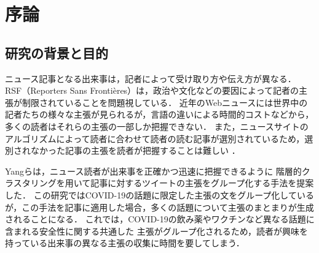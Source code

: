 \documentclass[12pt,a4j,dvipdfmx]{jreport}
\begin{document}



\chapter{序論}


\section{研究の背景と目的}

ニュース記事となる出来事は，記者によって受け取り方や伝え方が異なる．
RSF（Reporters Sans Frontières）は，政治や文化などの要因によって記者の主張が制限されていることを問題視している\cite{2021_world_press_freedom_index}．
近年のWebニュースには世界中の記者たちの様々な主張が見られるが，言語の違いによる時間的コストなどから，多くの読者はそれらの主張の一部しか把握できない．
また，ニュースサイトのアルゴリズムによって読者に合わせて読者の読む記事が選別されているため，選別されなかった記事の主張を読者が把握することは難しい
\cite{pariser_beware_nodate}\cite{bruns_filter_2019}．

Yangらは，ニュース読者が出来事を正確かつ迅速に把握できるように
階層的クラスタリングを用いて記事に対するツイートの主張をグループ化する手法を提案した\cite{yang_scalable_2021}．
この研究ではCOVID-19の話題に限定した主張の文をグループ化しているが，この手法を記事に適用した場合，多くの話題について主張のまとまりが生成されることになる．
これでは，COVID-19の飲み薬やワクチンなど異なる話題に含まれる安全性に関する共通した
主張がグループ化されるため，読者が興味を持っている出来事の異なる主張の収集に時間を要してしまう．
\end{document}
